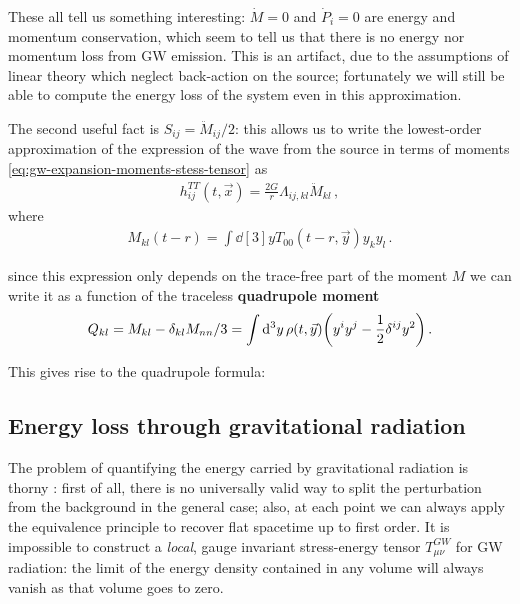 \documentclass[main.tex]{subfiles}
\begin{document}
These all tell us something interesting: \(\dot{M} = 0\) and \(\dot{P}_{i} = 0\) are energy and momentum conservation, which seem to tell us that there is no energy nor momentum loss from \ac{GW} emission. 
This is an artifact, due to the assumptions of linear theory which neglect back-action on the source; fortunately we will still be able to compute the energy loss of the system even in this approximation.

The second useful fact is \(S_{ij} = \ddot{M}_{ij} / 2\): this allows us to write the lowest-order approximation of the expression of the wave from the source in terms of moments \eqref{eq:gw-expansion-moments-stess-tensor} as 
%
\begin{align}
h_{ij}^{TT}(t, \vec{x}) = \frac{2 G}{r} \Lambda_{ij, kl} \ddot{M}_{kl}
\,,
\end{align}
%
where 
%
\begin{align}
M_{kl}(t-r) = \int \dd[3]{y} T_{00}(t -r, \vec{y}) y_k y_l
\,.
\end{align}

since this expression only depends on the trace-free part of the moment \(M\) we can write it as a function of the traceless \textbf{quadrupole moment} 
%
\begin{align} \label{eq:quadrupole}
Q_{kl} = M_{kl} - \delta_{kl} M_{nn} / 3
= \int \dd[3]{y} \rho (t, \vec{y}) \qty(y^{i } y^{j} - \frac{1}{2} \delta^{ij} y^2)
\,.
\end{align}

This gives rise to the quadrupole formula:
%

\subsection{Energy loss through gravitational radiation}

The problem of quantifying the energy carried by gravitational radiation is thorny \cite[sec.\ 20.4]{misnerGravitation1973}: first of all, there is no universally valid way to split the perturbation from the background in the general case; also, at each point we can always apply the equivalence principle to recover flat spacetime up to first order. 
It is impossible to construct a \emph{local}, gauge invariant stress-energy tensor \(T_{\mu \nu }^{GW}\) for \ac{GW} radiation: the limit of the energy density contained in any volume will always vanish as that volume goes to zero. 
\end{document}
